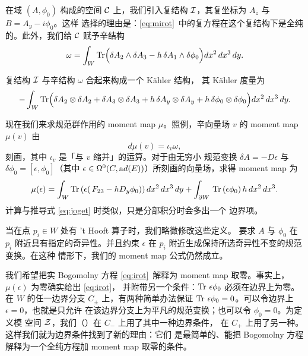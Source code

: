 在域 $(A,\phi_0)$ 构成的空间 ${\EUC}$ 上，我们引入复结构
${\cal I}$，其复坐标为 $A_{\bar z}$ 与 $B=A_y-i\phi_0$。这样
选择的理由是：\eqref{eq:mirot}\ 中的复方程在这个复结构下是全纯
的。此外，我们给 ${\EUC}$ 赋予辛结构 %
\setcounter{equation}{15}
\begin{equation}\label{eq:uryt}
\omega=\int_{W}\Tr\Bigl(\delta A_2\wedge
\delta A_3-h\,\delta A_1\wedge \delta\phi_0\Bigr) dx^2\,dx^3\,dy.
\end{equation}

复结构 ${\cal I}$ 与辛结构 $\omega$ 合起来构成一个 Kähler 结构，
其 Kähler 度量为
\setcounter{equation}{16}
\begin{equation}\label{eq:ryt}
-\int_W\Tr\Bigl( \delta A_2\otimes \delta A_2+\delta
A_3\otimes \delta A_3+h\,\delta A_y\otimes \delta A_y+h\,\delta
\phi_0\otimes \delta \phi_0\Bigr)dx^2\,dx^3\,dy.
\end{equation}

现在我们来求规范群作用的 moment map $\mu$。照例，辛向量场 $v$
的 moment map $\mu(v)$ 由
\setcounter{equation}{17}
\begin{equation}\label{eq:charby}
d\mu(v)=\iota_v\omega,
\end{equation}
 刻画，其中 $\iota_v$ 是「与 $v$ 缩并」的运算。对于由无穷小
规范变换 $\delta A=-D\epsilon$ 与
$\delta\phi_0 =[\epsilon,\phi_0]$（其中
$\epsilon\in \Omega^0(C,{\rm ad}(E))$）所刻画的向量场，求得
moment map 为 %
\setcounter{equation}{18}
\begin{equation}\label{eq:prigo}
\mu(\epsilon)=\int_W\Tr\left(\epsilon(
\,F_{23}-hD_y\phi_0)\right)dx^2\,dx^3\,dy+ \int_{\partial
W}\,\Tr\,(\epsilon\phi_0) \,h\,dx^2\,dx^3.
\end{equation}
 计算与推导式 \eqref{eq:joget} 时类似，只是分部积分时会多出一个
边界项。

当在点 $p_i\in W$ 处有 't Hooft 算子时，我们略微修改这些定义。
要求 $A$ 与 $\phi_0$ 在 $p_i$ 附近具有指定的奇异性。并且约束
$\epsilon$ 在 $p_i$ 附近生成保持所选奇异性不变的规范变换。在这种
情形下，我们的 moment map 公式仍然成立。

我们希望把实 Bogomolny 方程 \eqref{eq:irot}\ 解释为 moment map
取零。事实上，$\mu(\epsilon)$ 为零确实给出 \eqref{eq:irot}，
并附带另一个条件：$\Tr\,\epsilon\phi_0$ 必须在边界上为零。在
$W$ 的任一边界分支 $C_\pm$ 上，有两种简单办法保证
$\Tr\,\epsilon\phi_0=0$。可以令边界上 $\epsilon=0$，也就是只允许
在该边界分支上为平凡的规范变换；也可以令 $\phi_0=0$。为定义模
空间 ${\EUZ}$，我们（\xutampo）在 $C_-$ 上用了其中一种边界条件，
在 $C_+$ 上用了另一种。这样我们就为边界条件找到了新的理由：它们
是最简单的、能把 Bogomolny 方程解释为一个全纯方程加 moment map
取零的条件。

